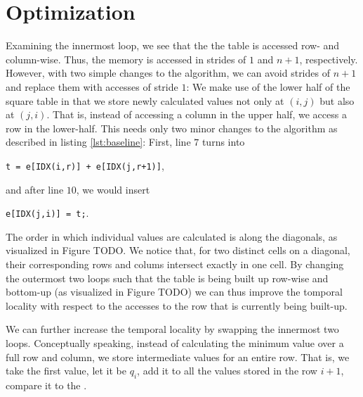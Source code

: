 \section{Optimization}
 Examining the innermost loop, we see that the
the table is accessed row- and column-wise. Thus, the memory is accessed in
strides of $1$ and $n+1$, respectively. However, with two simple changes to the
algorithm, we can avoid strides of $n+1$ and replace them with accesses of
stride $1$: We make use of the lower half of the square table in that we store
newly calculated values not only at $(i,j)$ but also at $(j,i)$. That is,
instead of accessing a column in the upper half, we access a row in the
lower-half. This needs only two minor changes to the algorithm as described in
listing \ref{lst:baseline}: First, line $7$ turns into
\begin{center}
\verb:t = e[IDX(i,r)] + e[IDX(j,r+1)]:, 
\end{center}
and after line $10$, we would insert 
\begin{center}
	\verb:e[IDX(j,i)] = t;:.
\end{center}
 The order in which individual values are calculated is along
the diagonals, as visualized in Figure TODO. We notice that, for two distinct
cells on a diagonal, their corresponding rows and colums intersect exactly in
one cell. By changing the outermost two loops such that the table is being built
up row-wise and bottom-up (as visualized in Figure TODO) we can thus improve the
tomporal locality with respect to the accesses to the row that is currently
being built-up.

 We can further increase the temporal locality by
swapping the innermost two loops. Conceptually speaking, instead of calculating
the minimum value over a full row and column, we store intermediate values for
an entire row. That is, we take the first value, let it be $q_i$, add it to
all the values stored in the row $i+1$, compare it to the .



